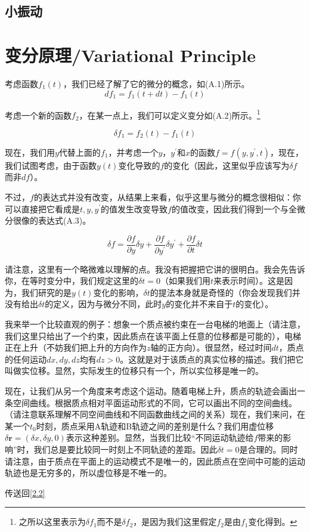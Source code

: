 \documentclass[a4paper, 10pt, openany]{book}%
\begin{document}
\section{小振动}




\newpage

\appendix
\chapter{变分原理/Variational Principle}

\label{appendix A}
考虑函数$f_1(t)$，我们已经了解了它的微分的概念，如(A.1)所示。
\begin{equation}
  df_1=f_1(t+dt)-f_1(t)
\end{equation}

考虑一个新的函数$f_2$，在某一点上，我们可以定义变分如(A.2)所示。\footnote{之所以这里表示为$\delta f_1$而不是$\delta f_2$，是因为我们这里假定$f_2$是由$f_1$变化得到。}

\begin{equation}
  \delta f_1=f_2(t)-f_1(t)
\end{equation}



现在，我们用$y$代替上面的$f_1$，并考虑一个$y$，$y^\prime$和$x$的函数$f=f(y,y^\prime,t)$，现在，我们试图考虑，由于函数$y(t)$变化导致的$f$的变化（因此，这里似乎应该写为$\delta f$而非$df$）。

不过，$f$的表达式并没有改变，从结果上来看，似乎这里与微分的概念很相似：你可以直接把它看成是$t,y,y^\prime$的值发生改变导致$f$的值改变，因此我们得到一个与全微分很像的表达式(A.3)。

\begin{equation}
  \delta f=\frac{\partial f}{\partial y}\delta y+\frac{\partial f}{\partial y^\prime}\delta y^\prime+\frac{\partial f}{\partial t}\delta t
\end{equation}

请注意，这里有一个略微难以理解的点。我没有把握把它讲的很明白。我会先告诉你，在等时变分中，我们规定这里的$\delta t=0$（如果我们用$t$来表示时间）。这是因为，我们研究的是$y(t)$变化的影响，$\delta t$的提法本身就是奇怪的（你会发现我们并没有给出$\delta t$的定义，因为与微分不同，此时$y$的变化并不来自于$t$的变化）。

我来举一个比较直观的例子：想象一个质点被约束在一台电梯的地面上（请注意，我们这里只给出了一个约束，因此质点在该平面上任意的位移都是可能的），电梯正在上升（不妨我们把上升的方向作为$z$轴的正方向）。很显然，经过时间$dt$，质点的任何运动$dx,dy,dz$均有$dz>0$。这就是对于该质点的真实位移的描述。我们把它叫做实位移。显然，实际发生的位移只有一个，所以实位移是唯一的。

现在，让我们从另一个角度来考虑这个运动。随着电梯上升，质点的轨迹会画出一条空间曲线。根据质点相对平面运动形式的不同，它可以画出不同的空间曲线。（请注意联系理解不同空间曲线和不同函数曲线之间的关系）现在，我们来问，在某一个$t_0$时刻，质点采用A轨迹和B轨迹之间的差别是什么？我们用虚位移$\delta \textbf{r}=(\delta x,\delta y,0)$表示这种差别。显然，当我们比较“不同运动轨迹给$f$带来的影响”时，我们总是要比较同一时刻上不同轨迹的差距。因此$\delta t=0$是合理的。同时请注意，由于质点在平面上的运动模式不是唯一的，因此质点在空间中可能的运动轨迹也是无穷多的，所以虚位移是不唯一的。

传送回\ref{2.2}
\end{document}

